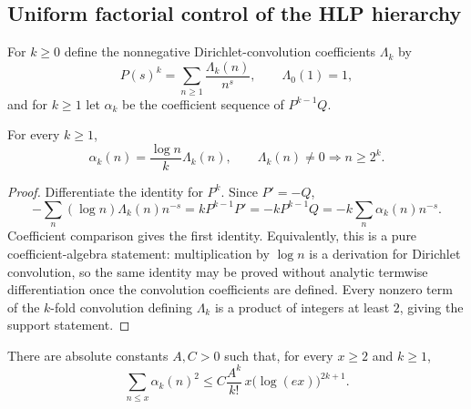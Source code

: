 \subsection{Uniform factorial control of the HLP hierarchy}
For $k\ge0$ define the nonnegative Dirichlet-convolution coefficients
$\Lambda_k$ by
\[
P(s)^k=\sum_{n\ge1}\frac{\Lambda_k(n)}{n^s},
\qquad \Lambda_0(1)=1,
\]
and for $k\ge1$ let $\alpha_k$ be the coefficient sequence of
$P^{k-1}Q$.

\begin{lemma}
\label{lem:alpha-identity}
For every $k\ge1$,
\begin{equation}
\boxed{
\alpha_k(n)=\frac{\log n}{k}\Lambda_k(n),
\qquad
\Lambda_k(n)\ne0\Longrightarrow n\ge2^k.
}
\label{eq:alpha-identity}
\end{equation}
\end{lemma}

\begin{proof}
Differentiate the identity for $P^k$. Since $P'=-Q$,
\[
-\sum_n(\log n)\Lambda_k(n)n^{-s}
=kP^{k-1}P'
=-kP^{k-1}Q
=-k\sum_n\alpha_k(n)n^{-s}.
\]
Coefficient comparison gives the first identity.  Equivalently, this is a
pure coefficient-algebra statement: multiplication by $\log n$ is a derivation
for Dirichlet convolution, so the same identity may be proved without analytic
termwise differentiation once the convolution coefficients are defined.  Every
nonzero term of the $k$-fold convolution defining $\Lambda_k$ is a product of
integers at least $2$, giving the support statement.
\end{proof}

\begin{proposition}
\label{prop:factorial-majorant}
There are absolute constants $A,C>0$ such that, for every $x\ge2$ and
$k\ge1$,
\begin{equation}
\boxed{
\sum_{n\le x}\alpha_k(n)^2
\le C\frac{A^k}{k!}\,
 x\bigl(\log(ex)\bigr)^{2k+1}.
}
\label{eq:factorial-majorant}
\end{equation}
\end{proposition}

